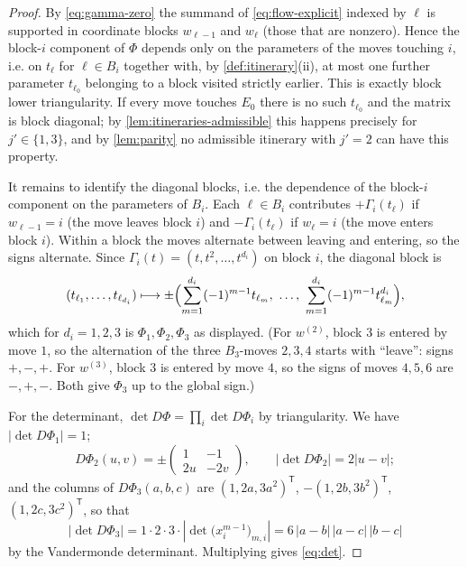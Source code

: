 \documentclass[11pt]{article}
\newcommand{\abs}[1]{\left|#1\right|}
\begin{document}
\begin{proof}
  By \eqref{eq:gamma-zero} the summand of \eqref{eq:flow-explicit} indexed by
  $\ell$ is supported in coordinate blocks $w_{\ell-1}$ and $w_\ell$ (those that
  are nonzero).  Hence the block-$i$ component of $\Phi$ depends only on the
  parameters of the moves touching $i$, i.e. on $t_\ell$ for $\ell\in B_i$
  together with, by \cref{def:itinerary}(ii), at most one further parameter
  $t_{\ell_0}$ belonging to a block visited strictly earlier.  This is exactly
  block lower triangularity.  If every move touches $E_0$ there is no such
  $t_{\ell_0}$ and the matrix is block diagonal; by
  \cref{lem:itineraries-admissible} this happens precisely for $j'\in\{1,3\}$,
  and by \cref{lem:parity} no admissible itinerary with $j'=2$ can have this
  property.

  It remains to identify the diagonal blocks, i.e. the dependence of the block-$i$
  component on the parameters of $B_i$.  Each $\ell\in B_i$ contributes
  $+\Gamma_i(t_\ell)$ if $w_{\ell-1}=i$ (the move leaves block $i$) and
  $-\Gamma_i(t_\ell)$ if $w_\ell=i$ (the move enters block $i$).  Within a block
  the moves alternate between leaving and entering, so the signs alternate.  Since
  $\Gamma_i(t)=(t,t^2,\dots,t^{d_i})$ on block $i$, the diagonal block is
  \[
    (t_{\ell_1},\dots,t_{\ell_{d_i}})\longmapsto
    \pm\Bigl(\sum_{m=1}^{d_i}(-1)^{m-1}t_{\ell_m},\ \dots,\
    \sum_{m=1}^{d_i}(-1)^{m-1}t_{\ell_m}^{d_i}\Bigr),
  \]
  which for $d_i=1,2,3$ is $\Phi_1,\Phi_2,\Phi_3$ as displayed.  (For $w^{(2)}$,
  block $3$ is entered by move $1$, so the alternation of the three $B_3$-moves
  $2,3,4$ starts with ``leave'': signs $+,-,+$.  For $w^{(3)}$, block $3$ is
  entered by move $4$, so the signs of moves $4,5,6$ are $-,+,-$.  Both give
  $\Phi_3$ up to the global sign.)

  For the determinant, $\det D\Phi=\prod_i\det D\Phi_i$ by triangularity.  We have
  $\abs{\det D\Phi_1}=1$;
  \[
    D\Phi_2(u,v)=\pm\begin{pmatrix}1&-1\\2u&-2v\end{pmatrix},
    \qquad \abs{\det D\Phi_2}=2\abs{u-v};
  \]
  and the columns of $D\Phi_3(a,b,c)$ are $(1,2a,3a^2)^{\mathsf T}$,
  $-(1,2b,3b^2)^{\mathsf T}$, $(1,2c,3c^2)^{\mathsf T}$, so that
  \[
    \abs{\det D\Phi_3}
    =1\cdot2\cdot3\cdot\abs{\det\bigl(x_i^{m-1}\bigr)_{m,i}}
    =6\,\abs{a-b}\,\abs{a-c}\,\abs{b-c}
  \]
  by the Vandermonde determinant.  Multiplying gives \eqref{eq:det}.
\end{proof}
\end{document}
